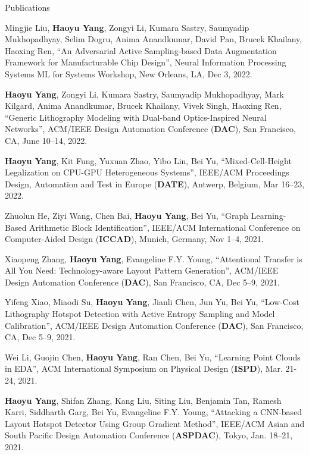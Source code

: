 \begin{rSection}{Publications}
\begin{description}[font=\normalfont]
	\item[{[C25]}] Mingjie Liu, \textbf{Haoyu Yang}, Zongyi Li, Kumara Sastry, Saumyadip Mukhopadhyay, Selim Dogru, Anima Anandkumar, David Pan, Brucek Khailany, Haoxing Ren,
	``An Adversarial Active Sampling-based Data Augmentation Framework for Manufacturable Chip Design'',
	Neural Information Processing Systems ML for Systems Workshop, New Orleans, LA, Dec 3, 2022.
	
	\item[{[C24]}] \textbf{Haoyu Yang}, Zongyi Li, Kumara Sastry, Saumyadip Mukhopadhyay, Mark Kilgard, Anima Anandkumar, Brucek Khailany, Vivek Singh, Haoxing Ren,
	``Generic Lithography Modeling with Dual-band Optics-Inspired Neural Networks'',
	ACM/IEEE Design Automation Conference (\textbf{DAC}), San Francisco, CA, June 10–14, 2022.
	
	\item[{[C23]}] \textbf{Haoyu Yang}, Kit Fung, Yuxuan Zhao, Yibo Lin, Bei Yu,
	``Mixed-Cell-Height Legalization on CPU-GPU Heterogeneous Systems'',
	IEEE/ACM Proceedings Design, Automation and Test in Europe (\textbf{DATE}), Antwerp, Belgium, Mar 16–23, 2022.
	
	\item[{[C22]}] Zhuolun He, Ziyi Wang, Chen Bai, \textbf{Haoyu Yang}, Bei Yu, ``Graph Learning-Based Arithmetic Block Identification'',
	IEEE/ACM International Conference on Computer-Aided Design (\textbf{ICCAD}), Munich, Germany, Nov 1–4, 2021.
	
	\item[{[C21]}] Xiaopeng Zhang, \textbf{Haoyu Yang}, Evangeline F.Y. Young, ``Attentional Transfer is All You Need: Technology-aware Layout Pattern Generation'',
	ACM/IEEE Design Automation Conference (\textbf{DAC}), San Francisco, CA, Dec 5–9, 2021.
	
	
	\item[{[C20]}] Yifeng Xiao, Miaodi Su, \textbf{Haoyu Yang}, Jianli Chen, Jun Yu, Bei Yu,
	``Low-Cost Lithography Hotspot Detection with Active Entropy Sampling and Model Calibration'',
	ACM/IEEE Design Automation Conference (\textbf{DAC}), San Francisco, CA, Dec 5–9, 2021.
	
	\item[{[C19]}] Wei Li, Guojin Chen, \textbf{Haoyu Yang}, Ran Chen, Bei Yu,
	``Learning Point Clouds in EDA'', ACM International Symposium on Physical Design (\textbf{ISPD}), Mar. 21-24, 2021.

	\item[{[C18]}] \textbf{Haoyu Yang}, Shifan Zhang, Kang Liu, Siting Liu, Benjamin Tan, Ramesh Karri, Siddharth Garg, Bei Yu, Evangeline F.Y. Young,
	``Attacking a CNN-based Layout Hotspot Detector Using Group Gradient Method'', 
	IEEE/ACM Asian and South Pacific Design Automation Conference (\textbf{ASPDAC}), Tokyo, Jan. 18–21, 2021.


\end{description}
\end{rSection}
